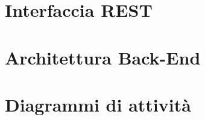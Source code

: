 \newpage

\section{Interfaccia REST}


\newpage


\section{Architettura Back-End}


\newpage

\section{Diagrammi di attività}

\newpage


